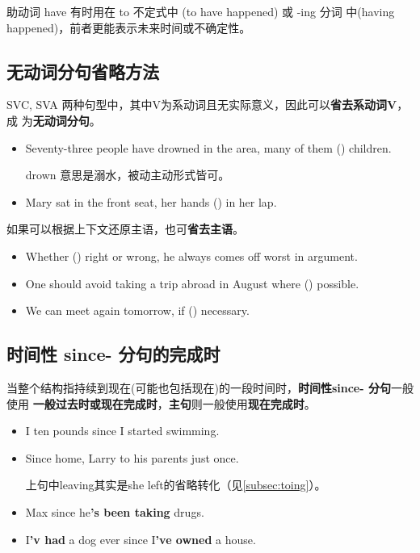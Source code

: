 助动词 have 有时用在 to 不定式中 (to have happened) 或 -ing 分词
中(having happened)，前者更能表示未来时间或不确定性。

\subsection{无动词分句省略方法}

SVC, SVA 两种句型中，其中V为系动词且无实际意义，因此可以\textbf{省去系动词V}，成
为\textbf{无动词分句}。

\begin{itemize}
\item Seventy-three people have drowned in the area, many of them
  () children.

  drown 意思是溺水，被动主动形式皆可。

\item  Mary sat in the front seat, her hands () in her lap.
\end{itemize}

如果可以根据上下文还原主语，也可\textbf{省去主语}。
\begin{itemize}
\item Whether () right or wrong, he always comes off worst in
  argument.

\item One should avoid taking a trip abroad in August where () possible.

\item We can meet again tomorrow, if () necessary.

\end{itemize}

\subsection{时间性 since- 分句的完成时}

当整个结构指持续到现在(可能也包括现在)的一段时间时，\textbf{时间性since- 分句}一般使用
\textbf{一般过去时或现在完成时}，\textbf{主句}则一般使用\textbf{现在完成时}。

\begin{itemize}
\item I  ten pounds since I started swimming.
\item Since  home, Larry  to his parents just once.

  上句中leaving其实是she left的省略转化（见\cref{subsec:toing}）。

\item Max  since he\textbf{'s been taking} drugs.
\item I\textbf{'v had} a dog ever since I\textbf{'ve owned} a house.
\end{itemize}

